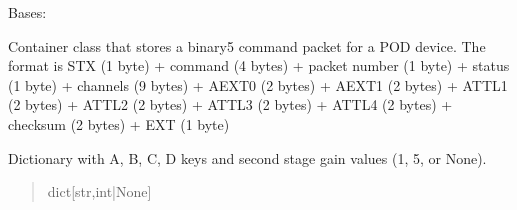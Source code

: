 \documentclass[letterpaper,10pt,english]{sphinxmanual}
\begin{document}
\begin{fulllineitems}
\label{\detokenize{PodApi.Packets:PodApi.Packets.Binary5.PacketBinary5}}
\pysigstartsignatures
{}
\pysigstopsignatures
\sphinxAtStartPar
Bases: {\hyperref[\detokenize{PodApi.Packets:PodApi.Packets.Packet.Packet}]{}}

\sphinxAtStartPar
Container class that stores a binary5 command packet for a POD device. The format is     STX (1 byte) + command (4 bytes) + packet number (1 byte) + status (1 byte)     + channels (9 bytes) + AEXT0 (2 bytes) + AEXT1 (2 bytes) + ATTL1 (2 bytes)     + ATTL2 (2 bytes) + ATTL3 (2 bytes) + ATTL4 (2 bytes) + checksum (2 bytes)     + EXT (1 byte)

\begin{fulllineitems}
\label{\detokenize{PodApi.Packets:PodApi.Packets.Binary5.PacketBinary5._ssGain}}
\pysigstartsignatures
{}
\pysigstopsignatures
\sphinxAtStartPar
Dictionary with A, B, C, D keys and             second stage gain values (1, 5, or None).
\begin{quote}\begin{description}
\sphinxAtStartPar
dict{[}str,int|None{]}


\end{description}
\end{quote}
\end{fulllineitems}
\end{fulllineitems}
\end{document}
